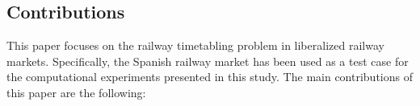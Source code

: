 \documentclass[Afour,sagev,times]{sagej}
\begin{document}

\subsection{Contributions}
\label{subsec:contributions}

This paper focuses on the railway timetabling problem in liberalized railway markets. Specifically, the Spanish railway market has been used as a test case for the computational experiments presented in this study. The main contributions of this paper are the following:
\end{document}
